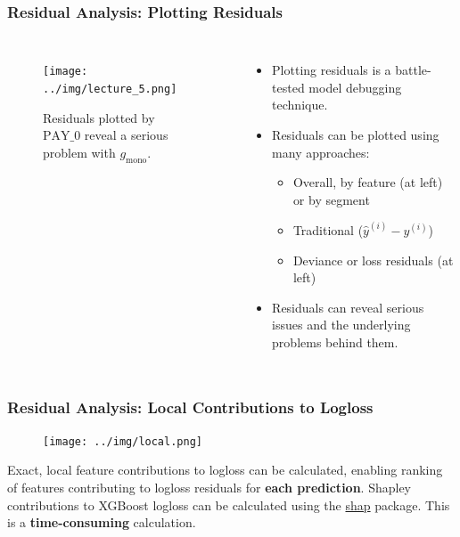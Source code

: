 \documentclass[11pt,
               aspectratio=169,
               hyperref={colorlinks}
               ]{beamer}
\begin{document}
			\begin{frame}[t]
		
				\frametitle{\textbf{Residual Analysis}: Plotting Residuals}
				
				\begin{columns}
				
						\begin{figure}
							\begin{center}
								\texttt{[image: ../img/lecture\_5.png]}
								\caption{Residuals plotted by $\text{PAY\_0}$ reveal a serious problem with $g_{\text{mono}}$.}
							\end{center}
						\end{figure}
						
						\begin{itemize}
							\item Plotting residuals is a battle-tested model debugging technique. 
							\item Residuals can be plotted using many approaches: 
							\begin{itemize}
								\item Overall, by feature (at left) or by segment
								\item Traditional ($\hat{y}^{(i)} - y^{(i)}$)
								\item Deviance or loss residuals (at left)
							\end{itemize}
							\item Residuals can reveal serious issues and the underlying problems behind them. 
						\end{itemize}
				
				\end{columns}				
								
			\end{frame}			

			\begin{frame}
	
				\frametitle{\textbf{Residual Analysis}: Local Contributions to Logloss}
	
				\begin{figure}
					\begin{center}
						\texttt{[image: ../img/local.png]}
					\end{center}
				\end{figure}	
				\scriptsize{Exact, local feature contributions to logloss can be calculated, enabling ranking of features contributing to logloss residuals for \textbf{each prediction}. Shapley contributions to XGBoost logloss can be calculated using the \href{https://github.com/slundberg/shap}{shap} package. This is a \textbf{time-consuming} calculation.}
				
			\end{frame}
\end{document}

